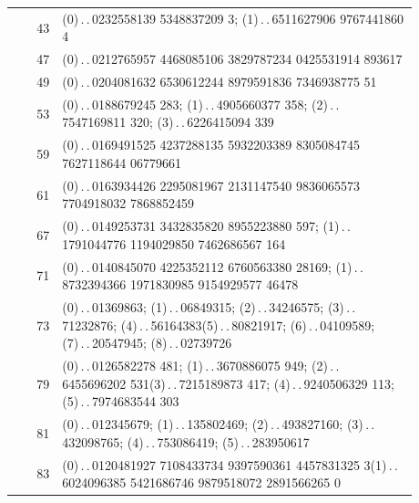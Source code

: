 \begin{longtable}{r||>{\raggedright\arraybackslash}p{0.88\linewidth}}
43 & \mbox{(0)\,.\,.\,}\mbox{0232558139} \mbox{5348837209} \mbox{3}; \mbox{(1)\,.\,.\,}\mbox{6511627906} \mbox{9767441860} \mbox{4}\\
47 & \mbox{(0)\,.\,.\,}\mbox{0212765957} \mbox{4468085106} \mbox{3829787234} \mbox{0425531914} \mbox{893617}\\
49 & \mbox{(0)\,.\,.\,}\mbox{0204081632} \mbox{6530612244} \mbox{8979591836} \mbox{7346938775} \mbox{51}\\
53 & \mbox{(0)\,.\,.\,}\mbox{0188679245} \mbox{283}; \mbox{(1)\,.\,.\,}\mbox{4905660377} \mbox{358}; \mbox{(2)\,.\,.\,}\mbox{7547169811} \mbox{320}; \mbox{(3)\,.\,.\,}\mbox{6226415094} \mbox{339}\\
59 & \mbox{(0)\,.\,.\,}\mbox{0169491525} \mbox{4237288135} \mbox{5932203389} \mbox{8305084745} \mbox{7627118644} \mbox{06779661}\\
61 & \mbox{(0)\,.\,.\,}\mbox{0163934426} \mbox{2295081967} \mbox{2131147540} \mbox{9836065573} \mbox{7704918032} \mbox{7868852459}\\
67 & \mbox{(0)\,.\,.\,}\mbox{0149253731} \mbox{3432835820} \mbox{8955223880} \mbox{597}; \mbox{(1)\,.\,.\,}\mbox{1791044776} \mbox{1194029850} \mbox{7462686567} \mbox{164}\\
71 & \mbox{(0)\,.\,.\,}\mbox{0140845070} \mbox{4225352112} \mbox{6760563380} \mbox{28169}; \mbox{(1)\,.\,.\,}\mbox{8732394366} \mbox{1971830985} \mbox{9154929577} \mbox{46478}\\
73 & \mbox{(0)\,.\,.\,}\mbox{01369863}; \mbox{(1)\,.\,.\,}\mbox{06849315}; \mbox{(2)\,.\,.\,}\mbox{34246575}; \mbox{(3)\,.\,.\,}\mbox{71232876}; \mbox{(4)\,.\,.\,}\mbox{56164383}\newline \mbox{(5)\,.\,.\,}\mbox{80821917}; \mbox{(6)\,.\,.\,}\mbox{04109589}; \mbox{(7)\,.\,.\,}\mbox{20547945}; \mbox{(8)\,.\,.\,}\mbox{02739726}\\
79 & \mbox{(0)\,.\,.\,}\mbox{0126582278} \mbox{481}; \mbox{(1)\,.\,.\,}\mbox{3670886075} \mbox{949}; \mbox{(2)\,.\,.\,}\mbox{6455696202} \mbox{531}\newline \mbox{(3)\,.\,.\,}\mbox{7215189873} \mbox{417}; \mbox{(4)\,.\,.\,}\mbox{9240506329} \mbox{113}; \mbox{(5)\,.\,.\,}\mbox{7974683544} \mbox{303}\\
81 & \mbox{(0)\,.\,.\,}\mbox{012345679}; \mbox{(1)\,.\,.\,}\mbox{135802469}; \mbox{(2)\,.\,.\,}\mbox{493827160}; \mbox{(3)\,.\,.\,}\mbox{432098765}; \mbox{(4)\,.\,.\,}\mbox{753086419}; \mbox{(5)\,.\,.\,}\mbox{283950617}\\
83 & \mbox{(0)\,.\,.\,}\mbox{0120481927} \mbox{7108433734} \mbox{9397590361} \mbox{4457831325} \mbox{3}\newline \mbox{(1)\,.\,.\,}\mbox{6024096385} \mbox{5421686746} \mbox{9879518072} \mbox{2891566265} \mbox{0}\\

\end{longtable}
